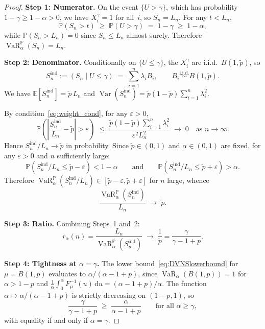 \documentclass[11pt]{article}
\theoremstyle{definition}
\newcommand{\dd}{\mathrm{d}}
\newcommand{\E}{\mathbb{E}}
\newcommand{\Var}{\operatorname{Var}}
\newcommand{\VaR}{\operatorname{VaR}}
\newcommand{\PP}{\mathbb{P}}
\newcommand{\1}{\mathbf{1}}
\begin{document}
\begin{proof}
\textbf{Step 1: Numerator.} On the event $\{U > \gamma\}$, which has probability $1 - \gamma \geq 1 - \alpha > 0$, we have $X_i^\gamma = 1$ for all~$i$, so $S_n = L_n$. For any $t < L_n$,
\[
  \PP(S_n > t) \;\geq\; \PP(U > \gamma) \;=\; 1 - \gamma \;\geq\; 1 - \alpha,
\]
while $\PP(S_n > L_n) = 0$ since $S_n \leq L_n$ almost surely. Therefore $\VaR_\alpha^\PP(S_n) = L_n$.

\textbf{Step 2: Denominator.} Conditionally on $\{U \leq \gamma\}$, the $X_i^\gamma$ are i.i.d.\ $B(1, \tilde{p})$, so
\[
  S_n^{\mathrm{ind}} := (S_n \mid U \leq \gamma) \;=\; \sum_{i=1}^n \lambda_i B_i, \qquad B_i \stackrel{\text{i.i.d.}}{\sim} B(1, \tilde{p}).
\]
We have $\E[S_n^{\mathrm{ind}}] = \tilde{p}\,L_n$ and $\Var(S_n^{\mathrm{ind}}) = \tilde{p}(1-\tilde{p})\sum_{i=1}^n \lambda_i^2$.

By condition~\eqref{eq:weight_cond}, for any $\varepsilon > 0$,
\[
  \PP\!\left(\left|\frac{S_n^{\mathrm{ind}}}{L_n} - \tilde{p}\right| > \varepsilon\right)
  \;\leq\; \frac{\tilde{p}(1-\tilde{p})\sum_{i=1}^n \lambda_i^2}{\varepsilon^2 L_n^2}
  \;\to\; 0 \quad\text{as } n \to \infty.
\]
Hence $S_n^{\mathrm{ind}}/L_n \to \tilde{p}$ in probability. Since $\tilde{p} \in (0,1)$ and $\alpha \in (0,1)$ are fixed, for any $\varepsilon > 0$ and $n$ sufficiently large:
\[
  \PP(S_n^{\mathrm{ind}}/L_n \leq \tilde{p} - \varepsilon) < 1 - \alpha
  \qquad\text{and}\qquad
  \PP(S_n^{\mathrm{ind}}/L_n \leq \tilde{p} + \varepsilon) > \alpha.
\]
Therefore $\VaR_\alpha^\PP(S_n^{\mathrm{ind}}/L_n) \in [\tilde{p} - \varepsilon, \tilde{p} + \varepsilon]$ for $n$ large, whence
\begin{equation}\label{eq:var_conv}
  \frac{\VaR_\alpha^\PP(S_n^{\mathrm{ind}})}{L_n} \;\to\; \tilde{p}.
\end{equation}

\textbf{Step 3: Ratio.} Combining Steps~1 and~2:
\[
  r_\alpha(n) = \frac{L_n}{\VaR_\alpha^\PP(S_n^{\mathrm{ind}})} \;\to\; \frac{1}{\tilde{p}} = \frac{\gamma}{\gamma - 1 + p}.
\]

\textbf{Step 4: Tightness at $\alpha = \gamma$.} The lower bound~\eqref{eq:DVNSlowerbound} for $\mu = B(1,p)$ evaluates to $\alpha/(\alpha - 1 + p)$, since $\VaR_\alpha(B(1,p)) = 1$ for $\alpha > 1 - p$ and $\frac{1}{\alpha}\int_0^\alpha F_\mu^{-1}(u)\,\dd u = (\alpha - 1 + p)/\alpha$. The function $\alpha \mapsto \alpha/(\alpha - 1 + p)$ is strictly decreasing on $(1-p, 1)$, so
\[
  \frac{\gamma}{\gamma - 1 + p} \;\geq\; \frac{\alpha}{\alpha - 1 + p}
  \qquad\text{for all } \alpha \geq \gamma,
\]
with equality if and only if $\alpha = \gamma$.
\end{proof}
\end{document}
